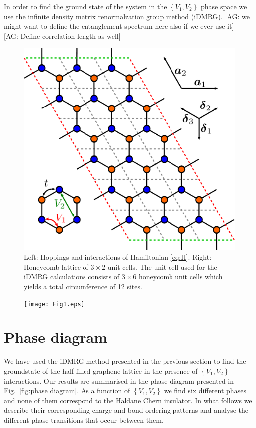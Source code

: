 \documentclass[aps,prx,10pt,twocolumn,floatfix,superscriptaddress,showpacs,numerical,footinbib]{revtex4-1}
\newcommand{\noteAG}[1]{{\color{blue} [AG: #1]}}
\begin{document}
In order to find the ground state of the system in the $\left\lbrace V_{1},V_{2}\right\rbrace$ phase space
we use the infinite density matrix renormalzation group method (iDMRG). 
%
\noteAG{we might want to define the entanglement spectrum here also if we ever use it}\\
\noteAG{Define correlation length as well}
%

\begin{figure}
 \includegraphics[scale=0.2]{pdf/unit_cell.pdf}
 \caption{Left: Hoppings and interactions of Hamiltonian \eqref{eq:H}. Right: Honeycomb lattice of $3 \times 2$ unit cells. The unit cell used for the iDMRG calculations consists of $3 \times 6$ honeycomb unit cells which yields a total circumference of 12 sites. \label{fig:Defs}}
\end{figure}
%
\begin{figure}[tb]
 \texttt{[image: Fig1.eps]}
 \caption{ 
  }
  \label{fig:honeycomblattice}
\end{figure} 
\section{Phase diagram}
%
We have used the iDMRG method presented in the previous section
to find the groundstate of the half-filled graphene lattice in the presence of 
$\left\lbrace V_{1},V_{2}\right\rbrace$ interactions.
%
Our results are summarised in the phase diagram presented in Fig.~\ref{fig:phase diagram}.
%
As a function of $\left\lbrace V_{1},V_{2}\right\rbrace$ we find six different phases and none of them correspond to the Haldane Chern insulator.
%
In what follows we describe their corresponding charge and bond ordering patterns and analyse the different phase transitions that occur between them.
%
\end{document}
